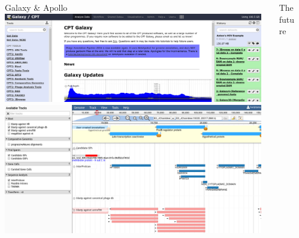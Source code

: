 \documentclass[final,t,20pt]{beamer}
\begin{document}
\begin{frame}[fragile]
\begin{columns}[t]
\begin{column}{.20\linewidth}
        \end{column}
        \begin{column}{.40\linewidth}
            \begin{block}{Galaxy \& Apollo}
                \includegraphics[width=0.98\textwidth]{./media/galaxy.png}\\[1cm]
                \includegraphics[width=0.98\textwidth]{./media/apollo.png}
            \end{block}
        \end{column}
    \begin{column}{.3\linewidth}
            \begin{block}{The future}
            \end{block}
    \end{column}
  \end{columns}
\end{frame}
\end{document}

